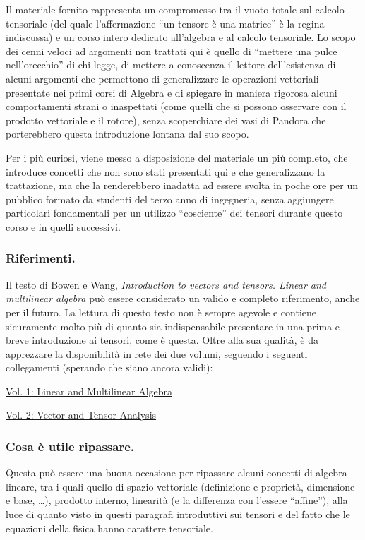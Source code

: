  \noindent
Il materiale fornito rappresenta un compromesso tra il vuoto totale sul calcolo tensoriale (del quale l'affermazione ``un tensore è una matrice'' è la regina indiscussa) e un corso intero dedicato all'algebra e al calcolo tensoriale. Lo scopo dei cenni veloci ad argomenti non trattati qui è quello di ``mettere una pulce nell'orecchio'' di chi legge, di mettere a conoscenza il lettore dell'esistenza di alcuni argomenti che permettono di generalizzare le operazioni vettoriali presentate nei primi corsi di Algebra e di spiegare in maniera rigorosa alcuni comportamenti strani o inaspettati (come quelli che si possono osservare con il prodotto vettoriale e il rotore), senza scoperchiare dei vasi di Pandora che porterebbero questa introduzione lontana dal suo scopo.

\vspace{10pt}
 \noindent
 Per i più curiosi, viene messo a disposizione del materiale un più completo, che introduce concetti che non sono stati presentati qui e che generalizzano la trattazione, ma che la renderebbero inadatta ad essere svolta in poche ore per un pubblico formato da studenti del terzo anno di ingegneria, senza aggiungere particolari fondamentali per un utilizzo ``cosciente'' dei tensori durante questo corso e in quelli successivi.

 \subsubsection{Riferimenti.}  
 Il testo di Bowen e Wang, \textit{Introduction to vectors and tensors. Linear and multilinear algebra} può essere considerato un valido e completo riferimento, anche per il futuro. La lettura di questo testo non è sempre agevole e contiene sicuramente molto più di quanto sia indispensabile presentare in una prima e breve introduzione ai tensori, come è questa.
 Oltre alla sua qualità, è da apprezzare la disponibilità in rete dei due volumi, seguendo i seguenti collegamenti (sperando che siano ancora validi):
 
 \href{http://oaktrust.library.tamu.edu/bitstream/handle/1969.1/2502/IntroductionToVectorsAndTensorsVol1.pdf}
 {Vol. 1: Linear and Multilinear Algebra}
 
 \href{http://oaktrust.library.tamu.edu/bitstream/handle/1969.1/3609/IntroductionToVectorsAndTensorsVol2.pdf}
 {Vol. 2: Vector and Tensor Analysis}
 
 
 
 \subsubsection{Cosa è utile ripassare.} Questa può essere una buona occasione per ripassare alcuni concetti di algebra lineare, tra i quali quello di spazio vettoriale (definizione e proprietà, dimensione e base, \dots), prodotto interno, linearità (e la differenza con l'essere ``affine''), alla luce di quanto visto in questi paragrafi introduttivi sui tensori e del fatto che le equazioni della fisica hanno carattere tensoriale.




